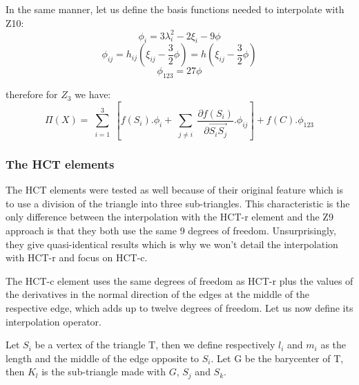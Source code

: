 \documentclass[proc]{edpsmath}
\begin{document}
\noindent In the same manner, let us define the basis functions needed to interpolate with Z10: 
\begin{equation*}
\phi_i = 3\lambda_{i}^2 -2 \xi_i - 9 \phi
\end{equation*}
\begin{equation*}
\phi_{ij} = h_{ij} (\xi_{ij} -\frac{3}{2}\phi)=h (\xi_{ij} -\frac{3}{2}\phi)
\end{equation*}
\begin{equation*}
\phi_{123}=27\phi
\end{equation*}

\noindent therefore for $Z_3$ we have:
\begin{equation*}
 \Pi (X) = \sum \limits_{\substack{i=1 }}^{3}{ [f(S_i).\phi_i + \sum \limits_{\substack{j\neq i }}^{}{ \frac{\partial f(S_i)}{\partial  \overrightarrow{ S_i S_j } }.\phi_{ij} } ] } + f(C).\phi_{123}
\end{equation*}

\subsubsection{The HCT elements}
The HCT elements were tested as well because of their original feature which is to use a division of the triangle into three sub-triangles.
This characteristic is the only difference between the interpolation with the HCT-r element and the  Z9 approach is that they both use the same 9 degrees of freedom. Unsurprisingly, they give quasi-identical results which is why we won't detail the interpolation with HCT-r and focus on HCT-c.

The HCT-c  element uses the same degrees of freedom as HCT-r plus the values of the derivatives in the normal direction of the edges at the middle of the respective edge, which adds up to twelve degrees of freedom. Let us now define its interpolation operator.

Let $S_i$ be a vertex of the triangle T, then we define respectively $l_i$ and $m_i$ as the length and the middle of the edge opposite to $S_i$. Let G be the barycenter of T, then $K_l$ is the sub-triangle made with $G$, $S_j$ and $S_k$.

\end{document}
